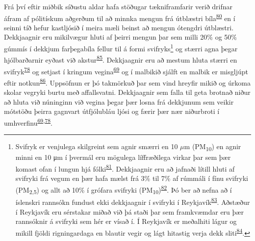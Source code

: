 \documentclass[icelandic,]{book}
\let\rmarkdownfootnote\footnote%
\def\footnote{\protect\rmarkdownfootnote}
\begin{document}
Frá því eftir miðbik síðustu aldar hafa stöðugar tækniframfarir verið drifnar áfram af pólitískum aðgerðum til að minnka mengun frá útblæstri bíla\textsuperscript{\protect\hyperlink{ref-lee2007innovation}{80}} en í seinni tíð hefur kastljósið í meira mæli beinst að mengun ótengdri útblæstri. Dekkjaagnir eru mikilvægur hluti af þeirri mengun þar sem milli 20\% og 50\% gúmmís í dekkjum farþegabíla fellur til á formi svifryks\footnote{Svifryk er venjulega skilgreint sem agnir smærri en 10 \(\mu\)m (PM\textsubscript{10}) en agnir minni en 10 μm í þvermál eru mögulega líffræðilega virkar þar sem þær komast ofan í lungun hjá fólki\textsuperscript{\protect\hyperlink{ref-heyder1986deposition}{81}}. Dekkjaagnir eru að jafnaði lítill hluti af svifryki frá vegum en þær hafa mælst frá 3\% til 7\% af rúmmáli í fínu svifryki (PM\textsubscript{2,5}) og allt að 10\% í grófara svifryki (PM\textsubscript{10})\textsuperscript{\protect\hyperlink{ref-grigoratos2014non}{82}}. Þó ber að nefna að í íslenskri rannsókn fundust ekki dekkjaagnir í svifryki í Reykjavík\textsuperscript{\protect\hyperlink{ref-Efla2015}{83}}. Aðstæður í Reykjavík eru sérstakar miðað við þá staði þar sem framkvæmdar eru þær rannsóknir á svifryki sem hér er vísað í. Í Reykjavík er meðalhiti lágur og mikill fjöldi rigningardaga en blautir vegir og lágt hitastig verja dekk sliti\textsuperscript{\protect\hyperlink{ref-le1998evaluation}{84}}.} og stærri agna þegar hjólbarðarnir eyðast við akstur\textsuperscript{\protect\hyperlink{ref-atech2001national}{85}}. Dekkjaagnir eru að mestum hluta stærri en svifryk\textsuperscript{\protect\hyperlink{ref-kreider2010physical}{78}} og setjast í kringum vegina\textsuperscript{\protect\hyperlink{ref-Cadle1978}{69}} og í malbikið sjálft en malbik er misgljúpt eftir notkun\textsuperscript{\protect\hyperlink{ref-Verschoor2016}{86}}. Uppsöfnun er þó takmörkuð þar sem vind hreyfir mikið og úrkoma skolar vegryki burtu með affallsvatni. Dekkjaagnir sem falla til geta brotnað niður að hluta við núninginn við vegina þegar þær losna frá dekkjunum sem veikir mótstöðu þeirra gagnvart útfjólubláu ljósi og færir þær nær niðurbroti í umhverfinu\textsuperscript{\protect\hyperlink{ref-Cadle1978}{69},\protect\hyperlink{ref-kreider2010physical}{78}}.
\end{document}

